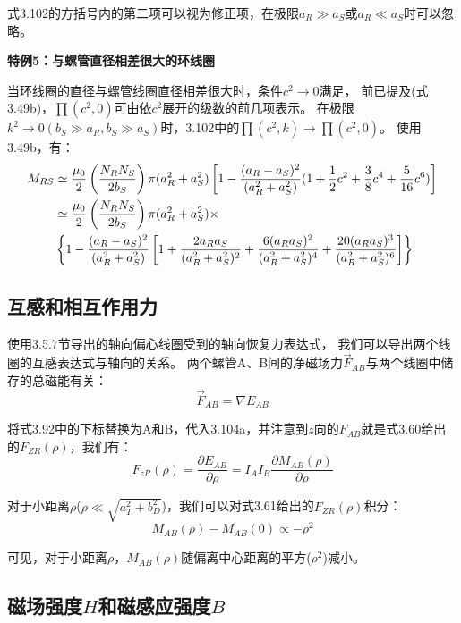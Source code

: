 式3.102的方括号内的第二项可以视为修正项，在极限$ a_R\gg a_S$或$a_R\ll a_S$时可以忽略。

\textbf{特例5：与螺管直径相差很大的环线圈} 

当环线圈的直径与螺管线圈直径相差很大时，条件$c^2\rightarrow 0$满足，
前已提及(式3.49b)，$\prod(c^2,0)$可由依$c^2$展开的级数的前几项表示。
在极限$k^2\rightarrow 0(b_S\gg a_R,b_S\gg a_S)$时，3.102中的$\prod(c^2,k)\rightarrow \prod(c^2,0)$。
使用3.49b，有：
  \begin{align}
M_{RS}&\simeq\frac{\mu_0}{2}\left(\frac{N_RN_S}{2b_S}\right)\pi(a_R^2+a_S^2)\left[1-\frac{(a_R-a_S)^2}{(a_R^2+a_S^2)}(1+\frac{1}{2}c^2+\frac{3}{8}c^4+\frac{5}{16}c^6)\right]\\\notag
&\simeq\frac{\mu_0}{2}\left(\frac{N_RN_S}{2b_S}\right)\pi(a_R^2+a_S^2)\times \\\notag
&\left\{1-\frac{(a_R-a_S)^2}{(a_R^2+a_S^2)}\left[1+\frac{2a_Ra_S}{(a_R^2+a_S^2)^2}+\frac{6(a_Ra_S)^2}{(a_R^2+a_S^2)^4}+\frac{20(a_Ra_S)^3}{(a_R^2+a_S^2)^6}\right]\right\}%
\end{align}

\subsection{互感和相互作用力}

使用3.5.7节导出的轴向偏心线圈受到的轴向恢复力表达式，
我们可以导出两个线圈的互感表达式与轴向的关系。
两个螺管A、B间的净磁场力$\vec{F}_{AB}$与两个线圈中储存的总磁能有关：
\begin{equation}
\vec{F}_{AB}=\nabla E_{AB}%
\end{equation}

将式3.92中的下标替换为A和B，代入3.104a，并注意到$z$向的$F_{AB}$就是式3.60给出的$F_{ZR}(\rho)$，我们有：
\begin{equation}
F_{zR}(\rho)=\frac{\partial E_{AB}}{\partial \rho}=I_AI_B\frac{\partial M_{AB}(\rho)}{\partial \rho}%
\end{equation}

对于小距离$\rho$($\rho\ll \sqrt{a_T^2+b_D^2}$)，我们可以对式3.61给出的$F_{ZR}(\rho)$积分：
\begin{equation}
M_{AB}(\rho)-M_{AB}(0)\propto-\rho^2%
\end{equation}

可见，对于小距离$\rho$，$M_{AB}(\rho)$随偏离中心距离的平方($\rho^2$)减小。 

\subsection*{磁场强度$H$和磁感应强度$B$}

